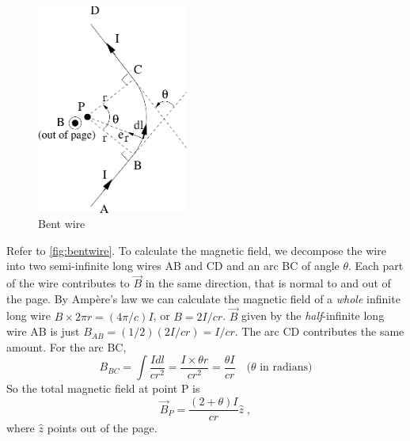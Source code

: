 \documentclass[makesolutionspdf]{esg8022pset}
\begin{document}
\begin{solution}
  \begin{figure}[H]
    \centering
    \includegraphics[width = 5cm]{BS1v05}
    \caption{Bent wire}
    \label{fig:bentwire}
  \end{figure}

  Refer to \autoref{fig:bentwire}.  To calculate the magnetic field, we
  decompose the wire into two semi-infinite long wires AB and CD and an arc BC
  of angle $\theta$.  Each part of the wire contributes to $\vec{B}$ in the same
  direction, that is normal to and out of the page.  By Amp\`{e}re's law we can
  calculate the magnetic field of a \emph{whole} infinite long wire $B\times 2\pi
  r=(4\pi/c)I$, or $B=2I/cr$.   $\vec{B}$ given by the \emph{half}-infinite
  long wire AB is just $B_{AB}=(1/2) (2I/cr)=I/cr$.  The arc CD contributes the same amount.
    For the arc BC,
  \begin{equation}
    B_{BC}=\int\frac{Idl}{cr^2}=\frac{I\times \theta r}{cr^2}=\frac{\theta I}{cr}\quad\text{($\theta$ in radians)}
  \end{equation}
  So the total magnetic field at point P is 
  \begin{equation}
    \vec B_P=\frac{(2+\theta)I}{cr}\hat z\;,
  \end{equation}
  where $\hat z$ points out of the page.
\end{solution}
\end{document}
